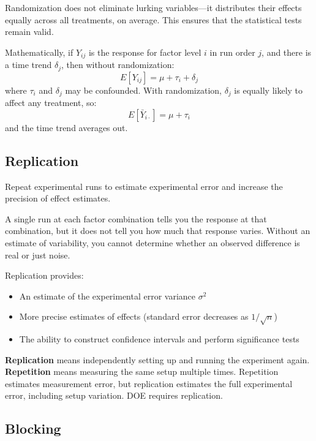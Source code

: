\documentclass[11pt]{book}
\begin{document}
Randomization does not eliminate lurking variables---it distributes their effects
equally across all treatments, on average. This ensures that the statistical
tests remain valid.

Mathematically, if $Y_{ij}$ is the response for factor level $i$ in run order
$j$, and there is a time trend $\delta_j$, then without randomization:
\[
E[Y_{ij}] = \mu + \tau_i + \delta_j
\]
where $\tau_i$ and $\delta_j$ may be confounded. With randomization, $\delta_j$
is equally likely to affect any treatment, so:
\[
E[\bar{Y}_{i\cdot}] = \mu + \tau_i
\]
and the time trend averages out.

\subsection{Replication}

\begin{keypoint}[Replication]
Repeat experimental runs to estimate experimental error and increase the
precision of effect estimates.
\end{keypoint}

A single run at each factor combination tells you the response at that
combination, but it does not tell you how much that response varies. Without an
estimate of variability, you cannot determine whether an observed difference is
real or just noise.

Replication provides:
\begin{itemize}[nosep]
\item An estimate of the experimental error variance $\sigma^2$
\item More precise estimates of effects (standard error decreases as $1/\sqrt{n}$)
\item The ability to construct confidence intervals and perform significance tests
\end{itemize}

\begin{warning}
\textbf{Replication} means independently setting up and running the experiment
again. \textbf{Repetition} means measuring the same setup multiple times.
Repetition estimates measurement error, but replication estimates the full
experimental error, including setup variation. DOE requires replication.
\end{warning}

\subsection{Blocking}
\end{document}
